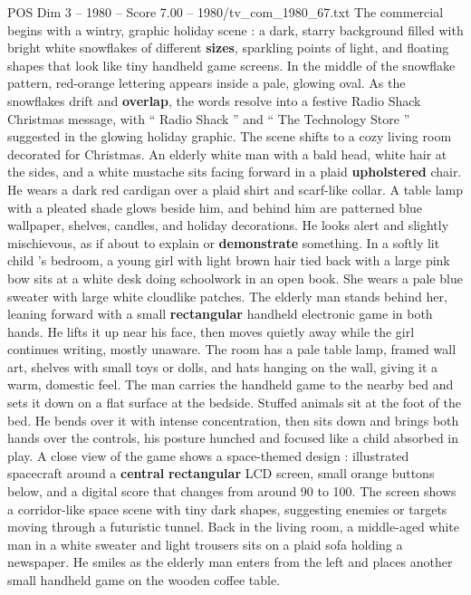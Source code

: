 \begin{textsample}{POS Dim 3 – 1980 – Score 7.00 – 1980/tv\_com\_1980\_67.txt}  \label{ex:f3_pos_049}
The commercial begins with a wintry, graphic holiday scene : a dark, starry background filled with bright white snowflakes of different \textbf{sizes}, sparkling points of light, and floating shapes that look like tiny handheld game screens.
In the middle of the snowflake pattern, red-orange lettering appears inside a pale, glowing oval.
As the snowflakes drift and \textbf{overlap}, the words resolve into a festive Radio Shack Christmas message, with “ Radio Shack ” and “ The Technology Store ” suggested in the glowing holiday graphic.
The scene shifts to a cozy living room decorated for Christmas.
An elderly white man with a bald head, white hair at the sides, and a white mustache sits facing forward in a plaid \textbf{upholstered} chair.
He wears a dark red cardigan over a plaid shirt and scarf-like collar.
A table lamp with a pleated shade glows beside him, and behind him are patterned blue wallpaper, shelves, candles, and holiday decorations.
He looks alert and slightly mischievous, as if about to explain or \textbf{demonstrate} something.
In a softly lit child ’s bedroom, a young girl with light brown hair tied back with a large pink bow sits at a white desk doing schoolwork in an open book.
She wears a pale blue sweater with large white cloudlike patches.
The elderly man stands behind her, leaning forward with a small \textbf{rectangular} handheld electronic game in both hands.
He lifts it up near his face, then moves quietly away while the girl continues writing, mostly unaware.
The room has a pale table lamp, framed wall art, shelves with small toys or dolls, and hats hanging on the wall, giving it a warm, domestic feel.
The man carries the handheld game to the nearby bed and sets it down on a flat surface at the bedside.
Stuffed animals sit at the foot of the bed.
He bends over it with intense concentration, then sits down and brings both hands over the controls, his posture hunched and focused like a child absorbed in play.
A close view of the game shows a space-themed design : illustrated spacecraft around a \textbf{central} \textbf{rectangular} LCD screen, small orange buttons below, and a digital score that changes from around 90 to 100.
The screen shows a corridor-like space scene with tiny dark shapes, suggesting enemies or targets moving through a futuristic tunnel.
Back in the living room, a middle-aged white man in a white sweater and light trousers sits on a plaid sofa holding a newspaper.
He smiles as the elderly man enters from the left and places another small handheld game on the wooden coffee table.

\end{textsample}
